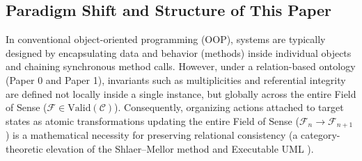 \documentclass[11pt,a4paper]{article}
\theoremstyle{definition}
\theoremstyle{plain}
\theoremstyle{remark}
\newcommand{\Valid}{\mathrm{Valid}}
\begin{document}
\subsection{Paradigm Shift and Structure of This Paper}
In conventional object-oriented programming (OOP), systems are typically designed by encapsulating data and behavior (methods) inside individual objects and chaining synchronous method calls. However, under a relation-based ontology (Paper 0 and Paper 1), invariants such as multiplicities and referential integrity are defined not locally inside a single instance, but globally across the entire Field of Sense ($\mathcal{F} \in \Valid(\mathcal{C})$). Consequently, organizing actions attached to target states as atomic transformations updating the entire Field of Sense ($\mathcal{F}_n \to \mathcal{F}_{n+1}$) is a mathematical necessity for preserving relational consistency (a category-theoretic elevation of the Shlaer--Mellor method and Executable UML \cite{shlaer1992,mellor2002,starr2001}).
\end{document}
